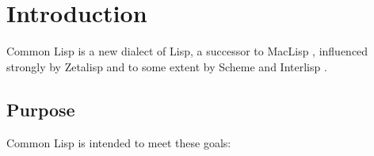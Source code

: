 
\clearpage\def\pagestatus{FINAL PROOF}

\ifx \rulang\Undef

\chapter{Introduction}

Common Lisp is a new dialect of Lisp, a
successor to MacLisp \cite{MOONUAL,PITMANUAL}, influenced strongly by
Zetalisp \cite{BLUE-LISPM,GREEN-LISPM} and to some extent by Scheme
\cite{SCHEME-REVISED-REPORT} and Interlisp \cite{INTERLISP}.

\section{Purpose}

Common Lisp is intended to meet these goals:

